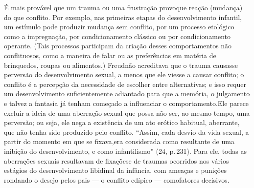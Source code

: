  É mais provável que um trauma ou uma frustração provoque reação
(mudança) do que conflito. Por exemplo, nas primeiras etapas do
desenvolvimento infantil, um estímulo pode produzir mudança sem
conflito, por um processo etológico como a impregnação,\idxestam{} por
condicionamento\idxcond{} clássico ou por condicionamento operante. (Tais
processos participam da criação desses comportamentos não conflituosos,
como a maneira de falar ou as preferências em matéria de brinquedos,
roupas ou alimentos.) Freud\idxfreudperve[|(] não acreditava que o trauma causasse
perversão do desenvolvimento sexual, a menos que ele viesse a causar
conflito; o conflito é a percepção da necessidade de escolher entre
alternativas; e isso requer um desenvolvimento suficientemente
adiantado para que a memória, o julgamento e talvez a fantasia já
tenham começado a influenciar o comportamento.\idxaberr[|(] Ele parece excluir a
ideia de uma aberração sexual que possa não ser, ao mesmo tempo, uma
perversão; ou seja, ele nega a existência de um ato erótico habitual,
aberrante, que não tenha sido produzido pelo conflito. ``Assim, cada
desvio da vida sexual, a partir do momento em que se fixava,\idxaberrfixa[|(] era
considerada como resultante de uma inibição do desenvolvimento, e como
infantilismo'' (24, p.\,231). Para ele, todas as aberrações
sexuais resultavam de fixações\idxlibidfixa[|(] e de traumas ocorridos nos vários
estágios do desenvolvimento libidinal da infância, com ameaças e
punições rondando o desejo pelos pais --- o conflito edípico --- como\idxtrauma[|)]
fatores decisivos.

